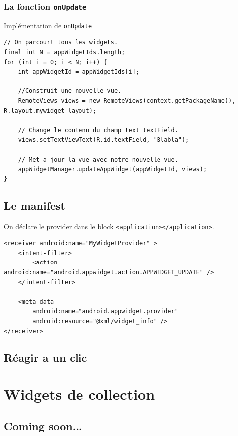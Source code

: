 \documentclass{beamer}
\begin{document}
\begin{frame}[fragile]
\frametitle{La fonction \verb!onUpdate!}
\begin{block}{Implémentation de \verb!onUpdate!}
\lstset{language=java}
\begin{lstlisting}
// On parcourt tous les widgets.
final int N = appWidgetIds.length;
for (int i = 0; i < N; i++) {
    int appWidgetId = appWidgetIds[i];

    //Construit une nouvelle vue.
    RemoteViews views = new RemoteViews(context.getPackageName(), R.layout.mywidget_layout);

    // Change le contenu du champ text textField.
    views.setTextViewText(R.id.textField, "Blabla");

    // Met a jour la vue avec notre nouvelle vue.
    appWidgetManager.updateAppWidget(appWidgetId, views);
}
\end{lstlisting}
\end{block}
\end{frame}

\subsection{Le manifest}
\begin{frame}[fragile]
\begin{block}{On déclare le provider dans le block \verb!<application></application>!.}
\lstset{language=xml}
\begin{lstlisting}
<receiver android:name="MyWidgetProvider" >
    <intent-filter>
        <action android:name="android.appwidget.action.APPWIDGET_UPDATE" />
    </intent-filter>

    <meta-data
        android:name="android.appwidget.provider"
        android:resource="@xml/widget_info" />
</receiver>
\end{lstlisting}
\end{block}
\end{frame}

\subsection{Réagir a un clic}


\section{Widgets de collection}
\subsection{Coming soon...}
\end{document}
